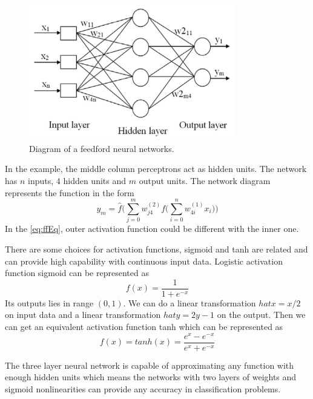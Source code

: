 \begin{figure}[!htb]
\centering
\includegraphics[width=0.8\textwidth]{Figure2-2.png}
\caption{\label{fig:ffnet}Diagram of a feedford neural networks.}
\end{figure}

In the example, the middle column perceptrons act as hidden units. The network has $n$ inputs, $4$ hidden units and $m$ output units. The network diagram represents the function in the form
\begin{equation}\label{eq:ffEq}
y_{m} = \hat{f}\Big(\sum_{j=0}^{m}w_{j4}^{(2)}f\big(\sum_{i=0}^{n}w_{4i}^{(1)}x_{i}\big)\Big)
\end{equation}
In the \ref{eq:ffEq}, outer activation function could be different with the inner one.

There are some choices for activation functions, sigmoid and tanh are related and can provide high capability with continuous input data. Logistic activation function sigmoid can be represented as 
\begin{equation}\label{eq:sigmoid}
f(x) = \frac{1}{1+e^{-x}}
\end{equation}
Its outputs lies in range $(0,1)$. We can do a linear transformation $hat{x}=x/2$ on input data and a linear transformation $hat{y}=2y-1$ on the output. Then we can get an equivalent activation function tanh which can be represented as
\begin{equation}\label{eq:tanh}
f(x) = tanh(x) = \frac{e^{x}-e^{-x}}{e^{x}+e^{-x}}
\end{equation}

The three layer neural network is capable of approximating any function with enough hidden units which means the networks with two layers of weights and sigmoid nonlinearities can provide any accuracy in classification problems. 

